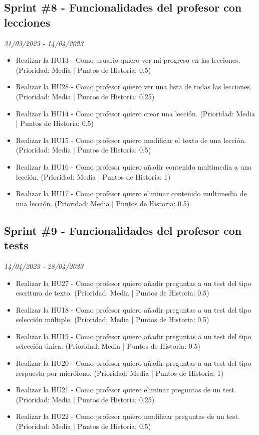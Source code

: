\subsection{Sprint \#8 - Funcionalidades del profesor con lecciones}
\textit{31/03/2023   -   14/04/2023}
\begin{itemize}

\item Realizar la HU13 - Como usuario quiero ver mi progreso en las lecciones. (Prioridad: Media | Puntos de Historia: 0.5)
\item Realizar la HU28 - Como profesor quiero ver una lista de todas las lecciones. (Prioridad: Media | Puntos de Historia: 0.25)
\item Realizar la HU14 - Como profesor quiero crear una lección. (Prioridad: Media | Puntos de Historia: 0.5)
\item Realizar la HU15 - Como profesor quiero modificar el texto de una lección. (Prioridad: Media | Puntos de Historia: 0.5)
\item Realizar la HU16 - Como profesor quiero añadir contenido multimedia a una lección. (Prioridad: Media | Puntos de Historia: 1)
\item Realizar la HU17 - Como profesor quiero eliminar contenido multimedia de una lección. (Prioridad: Media | Puntos de Historia: 0.5)
\end{itemize}

\subsection{Sprint \#9 - Funcionalidades del profesor con tests}
\textit{14/04/2023   -   28/04/2023}
\begin{itemize}
\item Realizar la HU27 - Como profesor quiero añadir preguntas a un test del tipo escritura de texto. (Prioridad: Media | Puntos de Historia: 0.5)
\item Realizar la HU18 - Como profesor quiero añadir preguntas a un test del tipo selección múltiple. (Prioridad: Media | Puntos de Historia: 0.5)
\item Realizar la HU19 - Como profesor quiero añadir preguntas a un test del tipo selección única. (Prioridad: Media | Puntos de Historia: 0.5)
\item Realizar la HU20 - Como profesor quiero añadir preguntas a un test del tipo respuesta por micrófono. (Prioridad: Media | Puntos de Historia: 1)
\item Realizar la HU21 - Como profesor quiero eliminar preguntas de un test. (Prioridad: Media | Puntos de Historia: 0.25)
\item Realizar la HU22 - Como profesor quiero modificar preguntas de un test. (Prioridad: Media | Puntos de Historia: 0.5)
\end{itemize}

